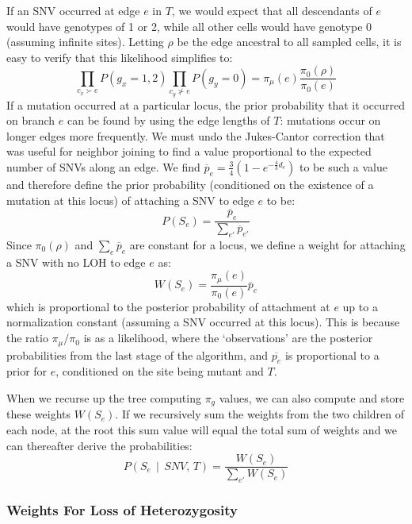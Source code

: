 \documentclass[../../main.tex]{subfiles}
\begin{document}
If an SNV occurred at edge $e$ in $T$, we would expect that all descendants of $e$ would have genotypes of 1 or 2, while all other cells would have genotype 0 (assuming infinite sites).
Letting $\rho$ be the edge ancestral to all sampled cells, it is easy to verify that this likelihood simplifies to:
\begin{equation*}
    \prod_{c_x\succ e}P(g_x =1,2)\prod_{c_y\nsucc e} P(g_y = 0) = \pi_\mu(e)\frac{\pi_0(\rho)}{\pi_0(e)}
\end{equation*}
If a mutation occurred at a particular locus, the prior probability that it occurred on branch $e$ can be found by using the edge lengths of $T$: mutations occur on longer edges more frequently.
We must undo the Jukes-Cantor correction that was useful for neighbor joining to find a value proportional to the expected number of SNVs along an edge.
We find $\overline{p}_e = \frac{3}{4}\left(1-e^{-\frac{4}{3}d_e}\right)$ to be such a value and therefore define the prior probability (conditioned on the existence of a mutation at this locus) of attaching a SNV to edge $e$ to be:
\begin{equation*}
    P(S_e) = \frac{\overline{p}_e}{\sum_{e'}\overline{p}_{e'}}
\end{equation*}
Since $\pi_0(\rho)$ and $\sum_{e}\overline{p}_{e}$ are constant for a locus, we define a weight for attaching a SNV with no LOH to edge $e$ as:
\begin{equation*}
    W(S_e) = \frac{\pi_\mu(e)}{\pi_0(e)} \overline{p}_e
\end{equation*}
which is proportional to the posterior probability of attachment at $e$ up to a normalization constant (assuming a SNV occurred at this locus).
This is because the ratio $\pi_\mu/\pi_0$ is as a likelihood, where the `observations' are the posterior probabilities from the last stage of the algorithm, and $\overline{p_e}$ is proportional to a prior for $e$, conditioned on the site being mutant and $T$.

When we recurse up the tree computing $\pi_g$ values, we can also compute and store these weights $W(S_e)$.
If we recursively sum the weights from the two children of each node, at the root this sum value will equal the total sum of weights and we can thereafter derive the probabilities:
\begin{equation} \label{eq:SNVattachP}
    P(S_e\,\mid\,SNV,\,T) = \frac{W(S_e)}{\sum_{e'}W(S_e)}
\end{equation}


\subsubsection*{Weights For Loss of Heterozygosity}
\end{document}
